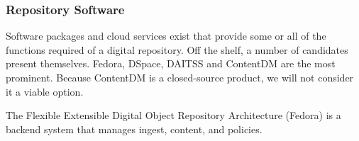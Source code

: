 \subsubsection{Repository Software}
Software packages and cloud services exist that provide some or all of the functions required of a digital repository. Off the shelf, a number of candidates present themselves. Fedora, DSpace, DAITSS and ContentDM are the most prominent. Because ContentDM is a closed-source product, we will not consider it a viable option.

The Flexible Extensible Digital Object Repository Architecture (Fedora) is a backend system that manages ingest, content, and policies. 
